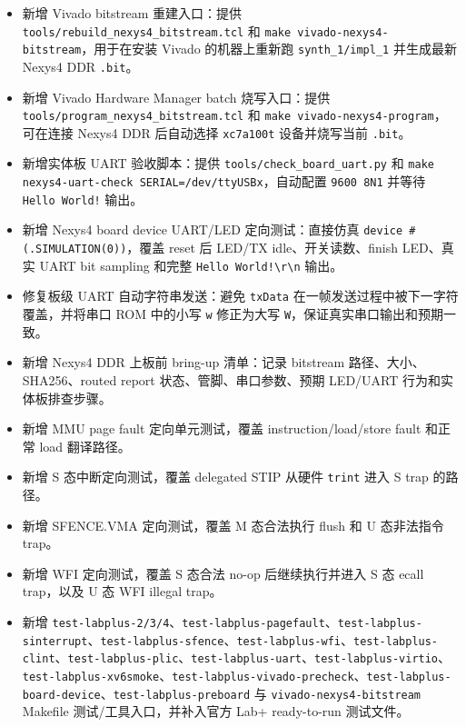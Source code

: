 \documentclass[UTF8,a4paper,11pt]{ctexart}
\begin{document}
\begin{itemize}
  \item 新增 Vivado bitstream 重建入口：提供 \texttt{tools/rebuild\_nexys4\_bitstream.tcl} 和 \texttt{make vivado-nexys4-bitstream}，用于在安装 Vivado 的机器上重新跑 \texttt{synth\_1/impl\_1} 并生成最新 Nexys4 DDR \texttt{.bit}。
  \item 新增 Vivado Hardware Manager batch 烧写入口：提供 \texttt{tools/program\_nexys4\_bitstream.tcl} 和 \texttt{make vivado-nexys4-program}，可在连接 Nexys4 DDR 后自动选择 \texttt{xc7a100t} 设备并烧写当前 \texttt{.bit}。
  \item 新增实体板 UART 验收脚本：提供 \texttt{tools/check\_board\_uart.py} 和 \texttt{make nexys4-uart-check SERIAL=/dev/ttyUSBx}，自动配置 \texttt{9600 8N1} 并等待 \texttt{Hello World!} 输出。
  \item 新增 Nexys4 board device UART/LED 定向测试：直接仿真 \texttt{device \#(.SIMULATION(0))}，覆盖 reset 后 LED/TX idle、开关读数、finish LED、真实 UART bit sampling 和完整 \texttt{Hello World!\textbackslash r\textbackslash n} 输出。
  \item 修复板级 UART 自动字符串发送：避免 \texttt{txData} 在一帧发送过程中被下一字符覆盖，并将串口 ROM 中的小写 \texttt{w} 修正为大写 \texttt{W}，保证真实串口输出和预期一致。
  \item 新增 Nexys4 DDR 上板前 bring-up 清单：记录 bitstream 路径、大小、SHA256、routed report 状态、管脚、串口参数、预期 LED/UART 行为和实体板排查步骤。
  \item 新增 MMU page fault 定向单元测试，覆盖 instruction/load/store fault 和正常 load 翻译路径。
  \item 新增 S 态中断定向测试，覆盖 delegated STIP 从硬件 \texttt{trint} 进入 S trap 的路径。
  \item 新增 SFENCE.VMA 定向测试，覆盖 M 态合法执行 flush 和 U 态非法指令 trap。
  \item 新增 WFI 定向测试，覆盖 S 态合法 no-op 后继续执行并进入 S 态 ecall trap，以及 U 态 WFI illegal trap。
  \item 新增 \texttt{test-labplus-2/3/4}、\texttt{test-labplus-pagefault}、\texttt{test-labplus-sinterrupt}、\texttt{test-labplus-sfence}、\texttt{test-labplus-wfi}、\texttt{test-labplus-clint}、\texttt{test-labplus-plic}、\texttt{test-labplus-uart}、\texttt{test-labplus-virtio}、\texttt{test-labplus-xv6smoke}、\texttt{test-labplus-vivado-precheck}、\texttt{test-labplus-board-device}、\texttt{test-labplus-preboard} 与 \texttt{vivado-nexys4-bitstream} Makefile 测试/工具入口，并补入官方 Lab+ ready-to-run 测试文件。
\end{itemize}
\end{document}
